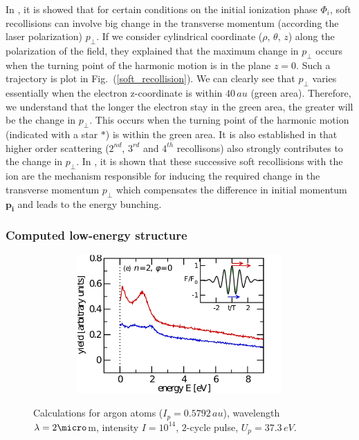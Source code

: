 \documentclass[a4paper]{article}
\begin{document}
In \cite{Liu_2010}, it is showed that for certain conditions on the initial ionization phase $\Phi_{i}$, soft recollisions can involve big change in the transverse momentum (according the laser polarization) $p_{\perp}$. If we consider cylindrical coordinate ($\rho$, $\theta$, $z$) along the polarization of the field, they explained that the maximum change in $p_{\perp}$ occurs when the turning point of the harmonic motion is in the plane $z=0$. Such a trajectory is plot in Fig.~(\ref{soft_recollision}). We can clearly see that $p_{\perp}$ varies essentially when the electron z-coordinate is within $40\,au$ (green area). Therefore, we understand that the longer the electron stay in the green area, the greater will be the change in $p_{\perp}$. This occurs when the turning point of the harmonic motion (indicated with a star $*$) is within the green area. It is also established in \cite{Liu_2010} that higher order scattering ($2^{nd}$, $3^{rd}$ and $4^{th}$ recollisons) also strongly contributes to the change in $p_{\perp}$. In \cite{Kastner_2012_soft}, it is shown that these successive soft recollisions with the ion are the mechanism responsible for inducing the required change in the transverse momentum $p_{\perp}$ which compensates the difference in initial momentum $\mathbf{p_{i}}$ and leads to the energy bunching.

\subsubsection{Computed low-energy structure}

\begin{figure}[htp]
\begin{subfigure} [t]{0.49\textwidth}
\hspace{-1cm}
 \includegraphics[width=1.2\textwidth, height=201px]{data/kastner.pdf}
 \label{KastnerLES} 
\end{subfigure}
\begin{subfigure} [t]{0.49\textwidth}
\hspace{-0.5cm}
  \raisebox{17px}{\resizebox{0.983\textwidth}{!}{}}
 \label{myLES} 
\end{subfigure}
 \caption{Calculations for argon atoms ($I_{p}=0.5792\,au$), wavelength $\lambda =2\micro$m, intensity $I=10^{14}$, $2$-cycle pulse,  $U_{p}=37.3\,eV$. \label{comparison_Kastner_LES}}
\end{figure}
\end{document}
